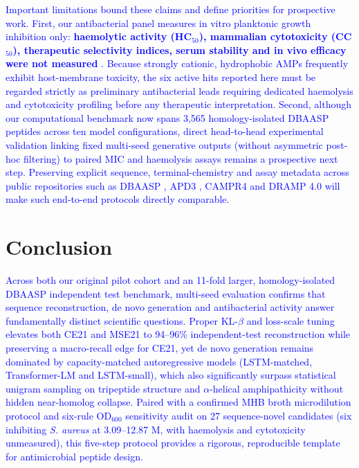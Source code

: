 \documentclass[unnumsec,webpdf,contemporary,large]{oup-authoring-template}
\newcommand{\rev}[1]{\textcolor{blue}{#1}}
\begin{document}
\rev{Important limitations bound these claims and define priorities for prospective work. First, our antibacterial panel measures in vitro planktonic growth inhibition only: \textbf{haemolytic activity (HC$_{50}$), mammalian cytotoxicity (CC$_{50}$), therapeutic selectivity indices, serum stability and in vivo efficacy were not measured} \cite{ref24,ref67,ref70}. Because strongly cationic, hydrophobic AMPs frequently exhibit host-membrane toxicity, the six active hits reported here must be regarded strictly as preliminary antibacterial leads requiring dedicated haemolysis and cytotoxicity profiling before any therapeutic interpretation. Second, although our computational benchmark now spans 3,565 homology-isolated DBAASP peptides across ten model configurations, direct head-to-head experimental validation linking fixed multi-seed generative outputs (without asymmetric post-hoc filtering) to paired MIC and haemolysis assays remains a prospective next step. Preserving explicit sequence, terminal-chemistry and assay metadata across public repositories such as DBAASP \cite{ref10}, APD3 \cite{ref60}, CAMPR4 \cite{ref63} and DRAMP 4.0 \cite{ref61} will make such end-to-end protocols directly comparable.}

\section{Conclusion}

\rev{Across both our original pilot cohort and an 11-fold larger, homology-isolated DBAASP independent test benchmark, multi-seed evaluation confirms that sequence reconstruction, de novo generation and antibacterial activity answer fundamentally distinct scientific questions. Proper KL-$\beta$ and loss-scale tuning elevates both CE21 and MSE21 to 94--96\% independent-test reconstruction while preserving a macro-recall edge for CE21, yet de novo generation remains dominated by capacity-matched autoregressive models (LSTM-matched, Transformer-LM and LSTM-small), which also significantly surpass statistical unigram sampling on tripeptide structure and $\alpha$-helical amphipathicity without hidden near-homolog collapse. Paired with a confirmed MHB broth microdilution protocol and six-rule OD$_{600}$ sensitivity audit on 27 sequence-novel candidates (six inhibiting \textit{S. aureus} at 3.09--12.87 \textmu{}M, with haemolysis and cytotoxicity unmeasured), this five-step protocol provides a rigorous, reproducible template for antimicrobial peptide design.}

\FloatBarrier
\end{document}
